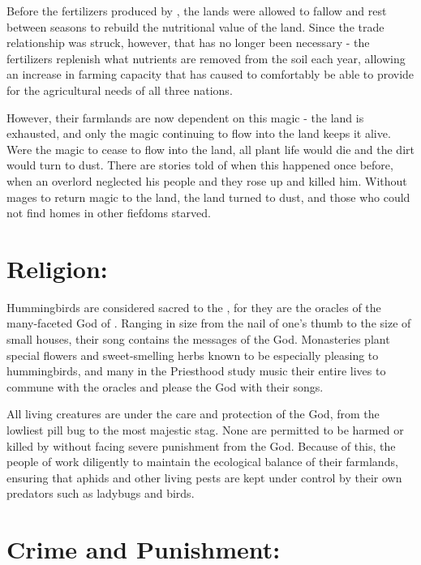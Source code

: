 \documentclass[blue]{GL2020}
\begin{document}
Before the fertilizers produced by \pTech{}, the lands were allowed to fallow and rest between seasons to rebuild the nutritional value of the land.  Since the trade relationship was struck, however, that has no longer been necessary - the fertilizers replenish what nutrients are removed from the soil each year, allowing an increase in farming capacity that has caused \pFarm{} to comfortably be able to provide for the agricultural needs of all three nations.

However, their farmlands are now dependent on this magic - the land is exhausted, and only the magic continuing to flow into the land keeps it alive.  Were the magic to cease to flow into the land, all plant life would die and the dirt would turn to dust.  There are stories told of when this happened once before, when an overlord neglected his people and they rose up and killed him.  Without mages to return magic to the land, the land turned to dust, and those who could not find homes in other fiefdoms starved.
 
\section*{Religion:}

Hummingbirds are considered sacred to the \pFarm{}, for they are the oracles of the many-faceted God of \pFarm{}.  Ranging in size from the nail of one's thumb to the size of small houses, their song contains the messages of the God.  Monasteries plant special flowers and sweet-smelling herbs known to be especially pleasing to hummingbirds, and many in the Priesthood study music their entire lives to commune with the oracles and please the God with their songs.

All living creatures are under the care and protection of the God, from the lowliest pill bug to the most majestic stag.  None are permitted to be harmed or killed by \pFarm{} without facing severe punishment from the God.  Because of this, the people of \pFarm{} work diligently to maintain the ecological balance of their farmlands, ensuring that aphids and other living pests are kept under control by their own predators such as ladybugs and birds.  %

\section*{Crime and Punishment:}
\end{document}
